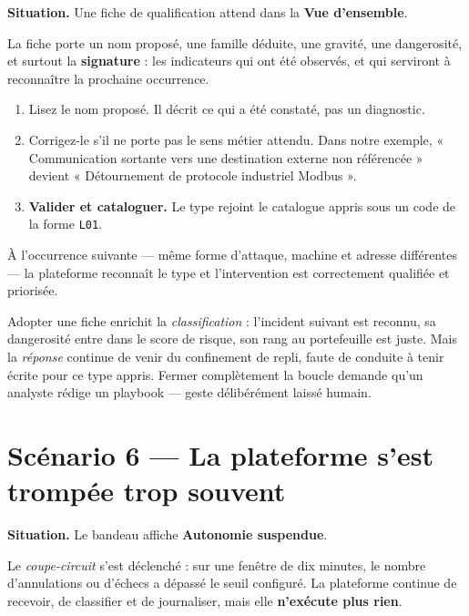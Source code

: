 \textbf{Situation.} Une fiche de qualification attend dans la
\textbf{Vue d'ensemble}.

La fiche porte un nom proposé, une famille déduite, une gravité, une
dangerosité, et surtout la \textbf{signature} : les indicateurs qui ont été
observés, et qui serviront à reconnaître la prochaine occurrence.

\begin{enumerate}[leftmargin=*]
  \item Lisez le nom proposé. Il décrit ce qui a été constaté, pas un
        diagnostic.
  \item Corrigez-le s'il ne porte pas le sens métier attendu. Dans notre
        exemple, « Communication sortante vers une destination externe non
        référencée » devient « Détournement de protocole industriel Modbus ».
  \item \textbf{Valider et cataloguer.} Le type rejoint le catalogue appris
        sous un code de la forme \texttt{L01}.
\end{enumerate}

À l'occurrence suivante — même forme d'attaque, machine et adresse
différentes — la plateforme reconnaît le type et l'intervention est
correctement qualifiée et priorisée.

\begin{tcolorbox}[colback=red!4!white, colframe=darkred,
  title=\textbf{Limitation connue --- apprendre à nommer, pas à répondre},
  fonttitle=\bfseries, boxrule=0.6pt]
Adopter une fiche enrichit la \emph{classification} : l'incident suivant est
reconnu, sa dangerosité entre dans le score de risque, son rang au portefeuille
est juste. Mais la \emph{réponse} continue de venir du confinement de repli,
faute de conduite à tenir écrite pour ce type appris. Fermer complètement la
boucle demande qu'un analyste rédige un playbook — geste délibérément laissé
humain.
\end{tcolorbox}

\section{Scénario 6 --- La plateforme s'est trompée trop souvent}

\textbf{Situation.} Le bandeau affiche \textbf{Autonomie suspendue}.

Le \emph{coupe-circuit} s'est déclenché : sur une fenêtre de dix minutes, le
nombre d'annulations ou d'échecs a dépassé le seuil configuré. La plateforme
continue de recevoir, de classifier et de journaliser, mais elle
\textbf{n'exécute plus rien}.

